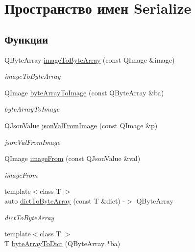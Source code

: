 \hypertarget{namespaceSerialize}{}\section{Пространство имен Serialize}
\label{namespaceSerialize}
\subsection*{Функции}
\begin{DoxyCompactItemize}
\item 
Q\+Byte\+Array \hyperlink{namespaceSerialize_a11412877176c667f31a331bfac95d7e1}{image\+To\+Byte\+Array} (const Q\+Image \&image)
\begin{DoxyCompactList}\small\item\em image\+To\+Byte\+Array \end{DoxyCompactList}\item 
Q\+Image \hyperlink{namespaceSerialize_ad70935346b9a0522990d0ff87e963a26}{byte\+Array\+To\+Image} (const Q\+Byte\+Array \&ba)
\begin{DoxyCompactList}\small\item\em byte\+Array\+To\+Image \end{DoxyCompactList}\item 
Q\+Json\+Value \hyperlink{namespaceSerialize_a794b837e3f9323b238c5b4d115f5c78b}{json\+Val\+From\+Image} (const Q\+Image \&p)
\begin{DoxyCompactList}\small\item\em json\+Val\+From\+Image \end{DoxyCompactList}\item 
Q\+Image \hyperlink{namespaceSerialize_a966ed9963741cb19a07f8b057faae920}{image\+From} (const Q\+Json\+Value \&val)
\begin{DoxyCompactList}\small\item\em image\+From \end{DoxyCompactList}\item 
{\footnotesize template$<$class T $>$ }\\auto \hyperlink{namespaceSerialize_a5318048e43f2cacc610f177d093283f8}{dict\+To\+Byte\+Array} (const T \&dict) -\/$>$ Q\+Byte\+Array
\begin{DoxyCompactList}\small\item\em dict\+To\+Byte\+Array \end{DoxyCompactList}\item 
{\footnotesize template$<$class T $>$ }\\T \hyperlink{namespaceSerialize_aac818c4b807e223e916bbe829e0d86ea}{byte\+Array\+To\+Dict} (Q\+Byte\+Array $\ast$ba)

\end{DoxyCompactItemize}
